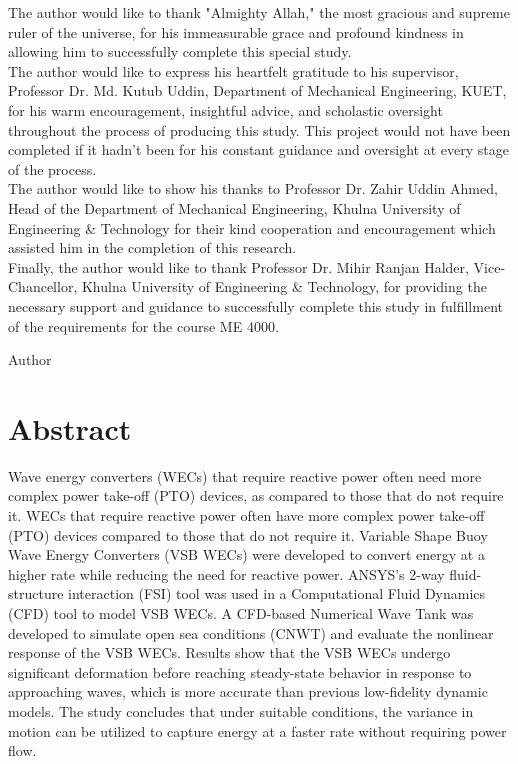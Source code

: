 \documentclass{article}
\begin{document}
The author would like to thank "Almighty Allah," the most gracious and supreme ruler of the universe, for his immeasurable grace and profound kindness in allowing him to successfully complete this special study.\\ 
The author would like to express his heartfelt gratitude to his supervisor, Professor Dr. Md. Kutub Uddin, Department of Mechanical Engineering, KUET, for his warm encouragement, insightful advice, and scholastic oversight throughout the process of producing this study. This project would not have been completed if it hadn't been for his constant guidance and oversight at every stage of the process.\\ The author would like to show his thanks to Professor Dr. Zahir Uddin Ahmed, Head of the Department of Mechanical Engineering, Khulna University of Engineering \& Technology for their kind cooperation and encouragement which assisted him in the completion of this research.\\
Finally, the author would like to thank Professor Dr. Mihir Ranjan Halder, Vice-Chancellor, Khulna University of Engineering \& Technology, for providing the necessary support and guidance to successfully complete this study in fulfillment of the requirements for the course ME 4000.\\
\vspace{1\baselineskip} %

\hfill Author %

\clearpage

\section*{\centering\fontsize{14}{16}\selectfont Abstract}
\vspace{3\baselineskip}
\thispagestyle{plain}
{\justifying\fontsize{12}{14}\selectfont
Wave energy converters (WECs) that require reactive power often need more complex power
take-off (PTO) devices, as compared to those that do not require it. WECs that require reactive
power often have more complex power take-off (PTO) devices compared to those that do not
require it. Variable Shape Buoy Wave Energy Converters (VSB WECs) were developed to
convert energy at a higher rate while reducing the need for reactive power. ANSYS's 2-way
fluid-structure interaction (FSI) tool was used in a Computational Fluid Dynamics (CFD) tool to
model VSB WECs. A CFD-based Numerical Wave Tank was developed to simulate open sea
conditions (CNWT) and evaluate the nonlinear response of the VSB WECs. Results show that
the VSB WECs undergo significant deformation before reaching steady-state behavior in
response to approaching waves, which is more accurate than previous low-fidelity dynamic
models. The study concludes that under suitable conditions, the variance in motion can be
utilized to capture energy at a faster rate without requiring power flow.
}
\clearpage
\end{document}
